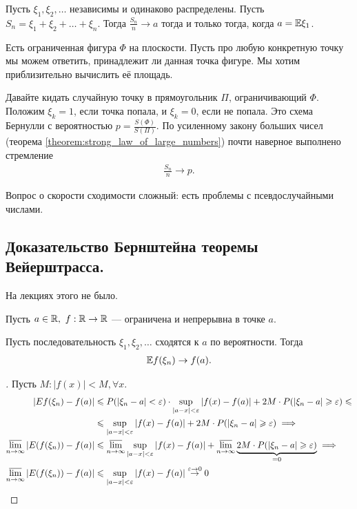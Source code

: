 \documentclass[../main.tex]{subfiles}
\begin{document}
\begin{thm}
 Пусть $ \xi_1, \xi_2, \ldots $  независимы и одинаково распределены. Пусть $ S_n  = \xi_1 + \xi_2 + \ldots + \xi_n $. Тогда $ \frac{S_n}{n} \to a $ тогда и только тогда, когда $ a = \mathbb E \xi_1 $.
\end{thm}

\begin{exmpl}
 Есть ограниченная фигура $ \Phi $ на плоскости. Пусть про любую конкретную точку мы можем ответить, принадлежит ли данная точка фигуре. Мы хотим приблизительно вычислить её площадь.

 Давайте кидать случайную точку в прямоугольник $ \Pi $, ограничивающий $ \Phi $. Положим $ \xi_k = 1 $, если точка попала, и $ \xi_k = 0 $, если не попала. Это схема Бернулли с вероятностью $ p = \frac{S(\Phi)}{S(\Pi)} $. По усиленному закону больших чисел (теорема \ref{theorem:strong_law_of_large_numbers}) почти наверное выполнено стремление
 \begin{align*}
  \frac{S_n}{n} \to p.
 \end{align*}

 Вопрос о скорости сходимости сложный: есть проблемы с псевдослучайными числами.
\end{exmpl}

\subsection{Доказательство Бернштейна теоремы Вейерштрасса.}

На лекциях этого не было.

\begin{thm}
 Пусть $a \in \mathbb{R}, \ f : \mathbb{R} \to \mathbb{R}$ --- ограничена и непрерывна в точке $a$.

 Пусть последовательность $\xi_1, \xi_2, \ldots$ сходятся к $a$ по вероятности.
 Тогда
 \begin{align*}
  \mathbb E f(\xi_n) \to f(a).
 \end{align*}
\end{thm}
\begin{proof}[]
 Пусть $M: |f(x)| < M, \forall x$.
 \begin{align*}
  |E f(\xi_n) - f(a)| &\leqslant P(|\xi_n - a| < \varepsilon) \cdot \sup_{|a - x| < \varepsilon} |f(x) - f(a)| + 2M \cdot P(|\xi_n - a| \geqslant \varepsilon) \leqslant \\
  & \leqslant \sup_{|a - x| < \varepsilon} |f(x) - f(a)| + 2M \cdot P(|\xi_n - a| \geqslant \varepsilon) \implies \\
  \varlimsup_{n \to \infty} |E(f(\xi_n)) - f(a)| &\leqslant \varlimsup_{n \to \infty} \sup_{|a - x| < \varepsilon} |f(x) - f(a)| + \varlimsup_{n \to \infty} \underbrace{2M \cdot P(|\xi_n - a| \geqslant \varepsilon)}_{=0} \implies  \\
  \varlimsup_{n \to \infty} |E(f(\xi_n)) - f(a)| &\leqslant \sup_{|a - x| < \varepsilon} |f(x) - f(a)| \overset{\varepsilon \to 0}{\to} 0
 \end{align*}
\end{proof}
\end{document}
